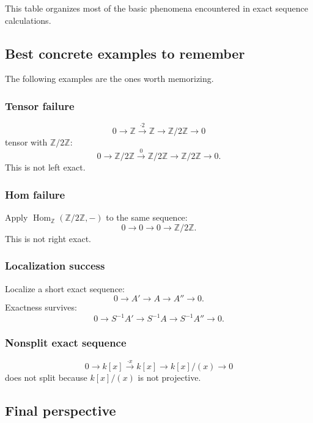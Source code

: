 \documentclass[12pt,a4paper]{article}
\theoremstyle{notespace}
\theoremstyle{definition}
\begin{document}
This table organizes most of the basic phenomena encountered in exact sequence calculations.

\subsection{Best concrete examples to remember}

The following examples are the ones worth memorizing.

\subsubsection*{Tensor failure}

\[
0 \longrightarrow \mathbb Z \xrightarrow{\cdot 2} \mathbb Z \longrightarrow \mathbb Z/2\mathbb Z \longrightarrow 0
\]
tensor with \(\mathbb Z/2\mathbb Z\):
\[
0 \longrightarrow \mathbb Z/2\mathbb Z \xrightarrow{0} \mathbb Z/2\mathbb Z \longrightarrow \mathbb Z/2\mathbb Z \longrightarrow 0.
\]
This is not left exact.

\subsubsection*{Hom failure}

Apply \(\operatorname{Hom}_{\mathbb Z}(\mathbb Z/2\mathbb Z,-)\) to the same sequence:
\[
0 \longrightarrow 0 \longrightarrow 0 \longrightarrow \mathbb Z/2\mathbb Z.
\]
This is not right exact.

\subsubsection*{Localization success}

Localize a short exact sequence:
\[
0 \longrightarrow A' \longrightarrow A \longrightarrow A'' \longrightarrow 0.
\]
Exactness survives:
\[
0 \longrightarrow S^{-1}A' \longrightarrow S^{-1}A \longrightarrow S^{-1}A'' \longrightarrow 0.
\]

\subsubsection*{Nonsplit exact sequence}

\[
0 \longrightarrow k[x] \xrightarrow{\cdot x} k[x] \longrightarrow k[x]/(x) \longrightarrow 0
\]
does not split because \(k[x]/(x)\) is not projective.

\subsection{Final perspective}
\end{document}
